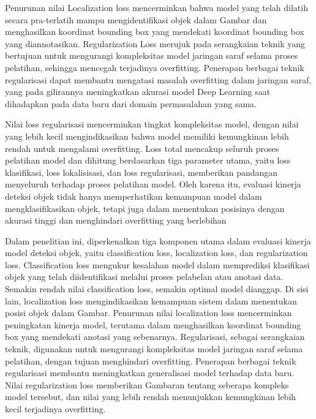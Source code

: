 Penurunan nilai Localization loss mencerminkan bahwa model yang telah dilatih secara pra-terlatih mampu mengidentifikasi objek dalam Gambar dan menghasilkan koordinat bounding box yang mendekati koordinat bounding box yang diannotasikan. Regularization Loss merujuk pada serangkaian teknik yang bertujuan untuk mengurangi kompleksitas model jaringan saraf selama proses pelatihan, sehingga mencegah terjadinya overfitting. Penerapan berbagai teknik regularisasi dapat membantu mengatasi masalah overfitting dalam jaringan saraf, yang pada gilirannya meningkatkan akurasi model Deep Learning saat dihadapkan pada data baru dari domain permasalahan yang sama. 

Nilai loss regularisasi mencerminkan tingkat kompleksitas model, dengan nilai yang lebih kecil mengindikasikan bahwa model memiliki kemungkinan lebih rendah untuk mengalami overfitting. Loss total mencakup seluruh proses pelatihan model dan dihitung berdasarkan tiga parameter utama, yaitu loss klasifikasi, loss lokalisisasi, dan loss regularisasi, memberikan pandangan menyeluruh terhadap proses pelatihan model. Oleh karena itu, evaluasi kinerja deteksi objek tidak hanya memperhatikan kemampuan model dalam mengklasifikasikan objek, tetapi juga dalam menentukan posisinya dengan akurasi tinggi dan menghindari overfitting yang berlebihan

Dalam penelitian ini, diperkenalkan tiga komponen utama dalam evaluasi kinerja model deteksi objek, yaitu classification loss, localization loss, dan regularization loss. Classification loss mengukur kesalahan model dalam memprediksi klasifikasi objek yang telah diidentifikasi
melalui proses pelabelan atau anotasi data. Semakin rendah nilai classification loss, semakin optimal model dianggap. Di sisi lain, localization loss mengindikasikan kemampuan sistem dalam menentukan posisi objek dalam Gambar. Penurunan nilai localization loss mencerminkan peningkatan kinerja model, terutama dalam menghasilkan koordinat bounding box yang mendekati anotasi yang sebenarnya. Regularisasi, sebagai serangkaian teknik, digunakan untuk mengurangi kompleksitas model jaringan saraf selama pelatihan, dengan tujuan menghindari overfitting. Penerapan berbagai teknik regularisasi membantu meningkatkan generalisasi model terhadap data baru. Nilai regularization loss memberikan Gambaran tentang seberapa kompleks model tersebut, dan nilai yang lebih rendah menunjukkan kemungkinan lebih kecil terjadinya overfitting.

